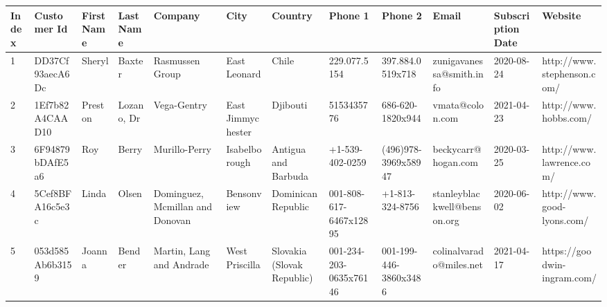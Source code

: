 \documentclass[11pt,a4paper]{article}
\begin{document}
\begin{table}[h]
\begin{tabular}{|l|l|l|l|l|l|l|l|l|l|l|l|}
\hline
Index & Customer Id & First Name & Last Name & Company & City & Country & Phone 1 & Phone 2 & Email & Subscription Date & Website \\ \hline
1 & DD37Cf93aecA6Dc & Sheryl & Baxter & Rasmussen Group & East Leonard & Chile & 229.077.5154 & 397.884.0519x718 & zunigavanessa@smith.info & 2020-08-24 & http://www.stephenson.com/ \\ \hline
2 & 1Ef7b82A4CAAD10 & Preston & Lozano, Dr & Vega-Gentry & East Jimmychester & Djibouti & 5153435776 & 686-620-1820x944 & vmata@colon.com & 2021-04-23 & http://www.hobbs.com/ \\ \hline
3 & 6F94879bDAfE5a6 & Roy & Berry & Murillo-Perry & Isabelborough & Antigua and Barbuda & +1-539-402-0259 & (496)978-3969x58947 & beckycarr@hogan.com & 2020-03-25 & http://www.lawrence.com/ \\ \hline
4 & 5Cef8BFA16c5e3c & Linda & Olsen & Dominguez, Mcmillan and Donovan & Bensonview & Dominican Republic & 001-808-617-6467x12895 & +1-813-324-8756 & stanleyblackwell@benson.org & 2020-06-02 & http://www.good-lyons.com/ \\ \hline
5 & 053d585Ab6b3159 & Joanna & Bender & Martin, Lang and Andrade & West Priscilla & Slovakia (Slovak Republic) & 001-234-203-0635x76146 & 001-199-446-3860x3486 & colinalvarado@miles.net & 2021-04-17 & https://goodwin-ingram.com/ \\ \hline
\end{tabular}
\end{table}
\end{document}
